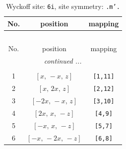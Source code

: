 \documentclass[fleqn,8pt]{jsarticle}
\begin{document}
\renewcommand{\arraystretch}{1.2}
\begin{longtable}{ccc}
\caption{Wyckoff site: {\tt 6i}, site symmetry: {\tt .m'.}}
 \\
 \hline \hline
No. & position & mapping \\ \hline \endfirsthead

\multicolumn{2}{l}{\tablename\ \thetable{}} \\
 \hline \hline
No. & position & mapping \\ \hline \endhead

 \hline \hline
\multicolumn{2}{r}{\footnotesize\it continued ...} \\ \endfoot

 \hline \hline
\multicolumn{2}{r}{} \\ \endlastfoot

1 & $\left[ x,\, - x,\, z \right]$ & {\tt [1,11]} \\ \hline
2 & $\left[ x,\, 2 x,\, z \right]$ & {\tt [2,12]} \\ \hline
3 & $\left[ - 2 x,\, - x,\, z \right]$ & {\tt [3,10]} \\ \hline
4 & $\left[ 2 x,\, x,\, - z \right]$ & {\tt [4,9]} \\ \hline
5 & $\left[ - x,\, x,\, - z \right]$ & {\tt [5,7]} \\ \hline
6 & $\left[ - x,\, - 2 x,\, - z \right]$ & {\tt [6,8]} \\
\end{longtable}
\renewcommand{\arraystretch}{1.2}
\end{document}
